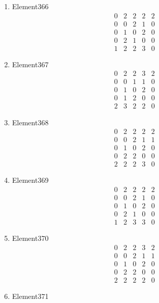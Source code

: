 \documentclass[12pt]{article}
\begin{document}
\begin{multicols}{3}
\begin{enumerate}
\item Element366
\begin{equation*}
\begin{array}{ccccc}
0&2&2&2&2\\
0&0&2&1&0\\
0&1&0&2&0\\
0&2&1&0&0\\
1&2&2&3&0
\end{array}
\end{equation*}
\item Element367
\begin{equation*}
\begin{array}{ccccc}
0&2&2&3&2\\
0&0&1&1&0\\
0&1&0&2&0\\
0&1&2&0&0\\
2&3&2&2&0
\end{array}
\end{equation*}
\item Element368
\begin{equation*}
\begin{array}{ccccc}
0&2&2&2&2\\
0&0&2&1&1\\
0&1&0&2&0\\
0&2&2&0&0\\
2&2&2&3&0
\end{array}
\end{equation*}
\item Element369
\begin{equation*}
\begin{array}{ccccc}
0&2&2&2&2\\
0&0&2&1&0\\
0&1&0&2&0\\
0&2&1&0&0\\
1&2&3&3&0
\end{array}
\end{equation*}
\item Element370
\begin{equation*}
\begin{array}{ccccc}
0&2&2&3&2\\
0&0&2&1&1\\
0&1&0&2&0\\
0&2&2&0&0\\
2&2&2&2&0
\end{array}
\end{equation*}
\item Element371
\begin{equation*}

\end{equation*}
\end{enumerate}
\end{multicols}
\end{document}
